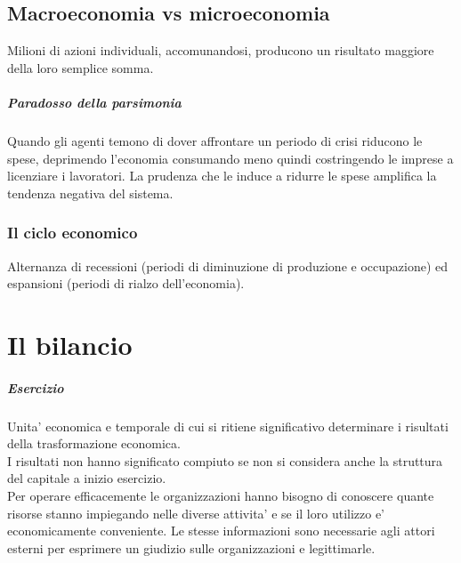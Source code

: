 \documentclass{report}
\begin{document}
	\section{Macroeconomia vs microeconomia}
	Milioni di azioni individuali, accomunandosi, producono un risultato maggiore della loro semplice somma.
	\paragraph{Paradosso della parsimonia} Quando gli agenti temono di dover affrontare un periodo di crisi riducono le spese, deprimendo l'economia consumando meno quindi costringendo le imprese a licenziare i lavoratori. La prudenza che le induce a ridurre le spese amplifica la tendenza negativa del sistema.
	\subsection{Il ciclo economico}
	Alternanza di recessioni (periodi di diminuzione di produzione e occupazione) ed espansioni (periodi di rialzo dell'economia).\\
	
	\chapter{Il bilancio}
	\paragraph{Esercizio} Unita' economica e temporale di cui si ritiene significativo determinare i risultati della trasformazione economica.
	\medskip \\I risultati non hanno significato compiuto se non si considera anche la struttura del capitale a inizio esercizio.
	\medskip \\Per operare efficacemente le organizzazioni hanno bisogno di conoscere quante risorse stanno impiegando nelle diverse attivita' e se il loro utilizzo e' economicamente conveniente. Le stesse informazioni sono necessarie agli attori esterni per esprimere un giudizio sulle organizzazioni e legittimarle.
\end{document}
